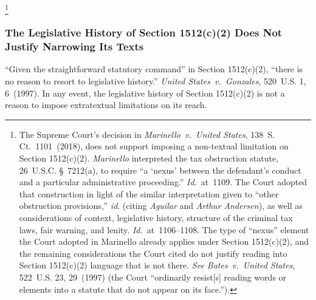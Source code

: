 \footnote{The Supreme Court's decision in \textit{Marinello~v.\ United States}, 138~S. Ct.~1101~(2018), does not support imposing a non-textual limitation on Section 1512(c)(2).
\textit{Marinello} interpreted the tax obstruction statute, 26~U.S.C. \S~7212(a), to require ``a `nexus' between the defendant's conduct and a particular administrative proceeding.''
\textit{Id.}~at~1109.
The Court adopted that construction in light of the similar interpretation given to ``other obstruction provisions,'' \textit{id}. (citing \textit{Aguilar} and \textit{Arthur Andersen}), as well as considerations of context, legislative history, structure of the criminal tax laws, fair warning, and lenity.
\textit{Id.}~at~1106--1108.
The type of ``nexus'' element the Court adopted in Marinello already applies under Section 1512(c)(2), and the remaining considerations the Court cited do not justify reading into Section 1512(c)(2) language that is not there.
\textit{See Bates~v.\ United States}, 522~U.S. 23, 29~(1997) (the Court ``ordinarily resist[s] reading words or elements into a statute that do not appear on its face.'').}

\subsubsection{The Legislative History of Section 1512(c)(2) Does Not Justify Narrowing Its Texts}

``Given the straightforward statutory command'' in Section 1512(c)(2), ``there is no reason to resort to legislative history.''
\textit{United States~v.\ Gonzales}, 520~U.S. 1, 6~(1997).
In any event, the legislative history of Section 1512(c)(2) is not a reason to impose extratextual limitations on its reach.

